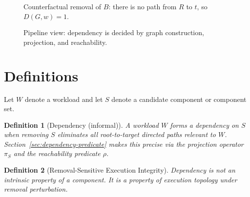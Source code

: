 \documentclass[11pt]{article}
\newtheorem{definition}{Definition}
\begin{document}
\begin{figure}[t]
\centering
{}
\caption{Counterfactual removal of $B$: there is no path from $R$ to $t$, so $D(G,w)=1$.}
\label{fig:remove-b}
\end{figure}

\begin{figure}[t]
\centering
{}
\caption{Pipeline view: dependency is decided by graph construction, projection, and reachability.}
\label{fig:pipeline}
\end{figure}

\section{Definitions}
\label{sec:definitions}
Let \(W\) denote a workload and let \(S\) denote a candidate component or component set.

\begin{definition}[Dependency (informal)]
A workload \(W\) forms a dependency on \(S\) when removing \(S\) eliminates all root-to-target directed paths relevant to \(W\).
Section~\ref{sec:dependency-predicate} makes this precise via the projection operator $\pi_S$ and the reachability predicate $\rho$.
\end{definition}

\begin{definition}[Removal-Sensitive Execution Integrity]
Dependency is not an intrinsic property of a component.
It is a property of execution topology under removal perturbation.
\end{definition}
\end{document}
